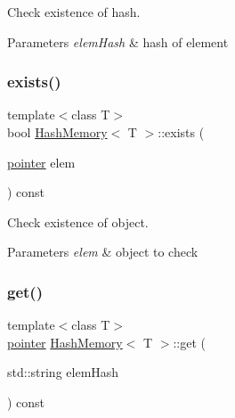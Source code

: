 Check existence of hash. 


\begin{DoxyParams}{Parameters}
{\em elem\+Hash} & hash of element \\
\hline
\end{DoxyParams}
\mbox{\label{classHashMemory_aca03e1a9ea9ce94e34871a004cc6f7e4}} 
\subsubsection{\texorpdfstring{exists()}{exists()}\hspace{0.1cm}{\footnotesize\ttfamily [2/2]}}
{\footnotesize\ttfamily template$<$class T$>$ \\
bool \mbox{\hyperlink{classHashMemory}{Hash\+Memory}}$<$ T $>$\+::exists (\begin{DoxyParamCaption}\item[{\mbox{\hyperlink{classHashMemory_ab2c7ace63d7bbcf75d523c445a3a0dbb}{pointer}}}]{elem }\end{DoxyParamCaption}) const\hspace{0.3cm}{\ttfamily [inline]}}



Check existence of object. 


\begin{DoxyParams}{Parameters}
{\em elem} & object to check \\
\hline
\end{DoxyParams}
\mbox{\label{classHashMemory_a51cf6dae3ddcf94f7bf13769f6677afd}} 
\subsubsection{\texorpdfstring{get()}{get()}}
{\footnotesize\ttfamily template$<$class T$>$ \\
\mbox{\hyperlink{classHashMemory_ab2c7ace63d7bbcf75d523c445a3a0dbb}{pointer}} \mbox{\hyperlink{classHashMemory}{Hash\+Memory}}$<$ T $>$\+::get (\begin{DoxyParamCaption}\item[{std\+::string}]{elem\+Hash }\end{DoxyParamCaption}) const\hspace{0.3cm}{\ttfamily [inline]}}



